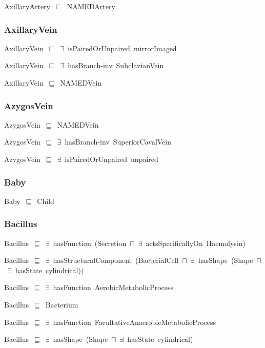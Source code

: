\documentclass{article}
\begin{document}
AxillaryArtery~\ensuremath{\sqsubseteq}~NAMEDArtery~

\subsubsection*{AxillaryVein}

AxillaryVein~\ensuremath{\sqsubseteq}~\ensuremath{\exists}~isPairedOrUnpaired~mirrorImaged~

AxillaryVein~\ensuremath{\sqsubseteq}~\ensuremath{\exists}~hasBranch-inv~SubclavianVein~

AxillaryVein~\ensuremath{\sqsubseteq}~NAMEDVein~

\subsubsection*{AzygosVein}

AzygosVein~\ensuremath{\sqsubseteq}~NAMEDVein~

AzygosVein~\ensuremath{\sqsubseteq}~\ensuremath{\exists}~hasBranch-inv~SuperiorCavalVein~

AzygosVein~\ensuremath{\sqsubseteq}~\ensuremath{\exists}~isPairedOrUnpaired~unpaired~

\subsubsection*{Baby}

Baby~\ensuremath{\sqsubseteq}~Child~

\subsubsection*{Bacillus}

Bacillus~\ensuremath{\sqsubseteq}~\ensuremath{\exists}~hasFunction~(Secretion~\ensuremath{\sqcap}~\ensuremath{\exists}~actsSpecificallyOn~Haemolysin)~

Bacillus~\ensuremath{\sqsubseteq}~\ensuremath{\exists}~hasStructuralComponent~(BacterialCell~\ensuremath{\sqcap}~\ensuremath{\exists}~hasShape~(Shape~\ensuremath{\sqcap}~\ensuremath{\exists}~hasState~cylindrical))~

Bacillus~\ensuremath{\sqsubseteq}~\ensuremath{\exists}~hasFunction~AerobicMetabolicProcess~

Bacillus~\ensuremath{\sqsubseteq}~Bacterium~

Bacillus~\ensuremath{\sqsubseteq}~\ensuremath{\exists}~hasFunction~FacultativeAnaerobicMetabolicProcess~

Bacillus~\ensuremath{\sqsubseteq}~\ensuremath{\exists}~hasShape~(Shape~\ensuremath{\sqcap}~\ensuremath{\exists}~hasState~cylindrical)~
\end{document}
